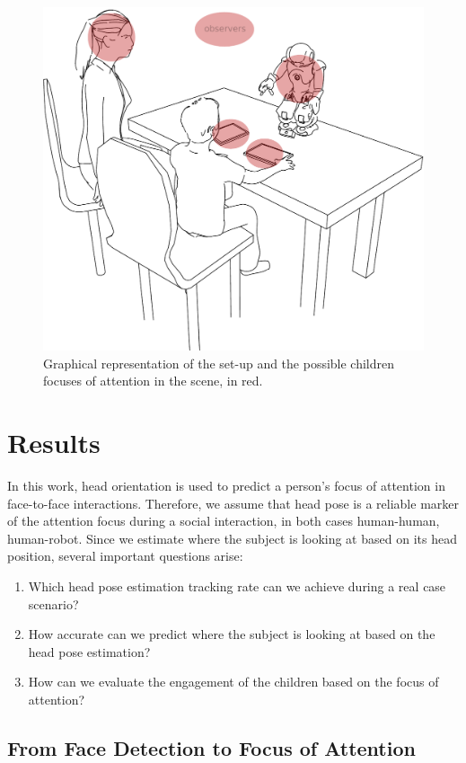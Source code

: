 \documentclass{sig-alternate}
\begin{document}
\begin{figure}[h!]
    \centering
    \includegraphics[width=0.7\columnwidth]{drawSetup}
    \caption{\small Graphical representation of the set-up and the possible children focuses of attention in the scene, in red.}
    \label{drawSetup}
\end{figure}


\section{Results}

In this work, head orientation is used to predict a person's focus of attention in face-to-face interactions. Therefore, we assume that head pose is a reliable marker of the attention focus during a social interaction, in both cases human-human, human-robot. Since we estimate where the subject is looking at based on its head position, several important questions arise:

\begin{enumerate}
\item Which head pose estimation tracking rate can we achieve during a real case scenario?  
\item How accurate can we predict where the subject is looking at based on the head pose estimation?
\item How can we evaluate the engagement of the children based on the focus of attention?\newline
\end{enumerate}

\subsection{From Face Detection to Focus of Attention} \label{fromFaceTo}
\end{document}
